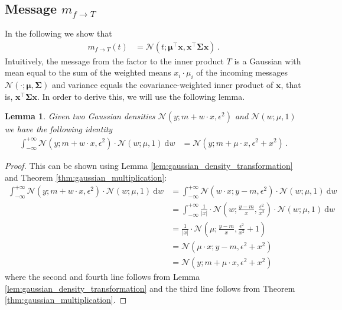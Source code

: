 \documentclass[a4paper]{article}
\newcommand{\Normal}[3]{{\mathcal N} \left({#1};{#2},{#3}\right)}
\newcommand{\bs}[1]{{\boldsymbol{#1}}}
\newcommand{\intd}[1]{\ \mathrm{d}{#1}}
\newcommand{\transpose}[1]{{#1}^\top}
\newtheorem{lemma}{Lemma}
\theoremstyle{definition}
\begin{document}
\subsection*{Message $m_{f\rightarrow T}$}
In the following we show that
\begin{align}
    m_{f\rightarrow T} (t)
     & = \Normal{t}{\transpose{\bs{\mu}}\bs{x}}{\transpose{\bs{x}}\bs{\Sigma}\bs{x}} \,. \label{eq:msg_from_f_to_t_gaussian_projection_factor}
\end{align}
Intuitively, the message from the factor to the inner product $T$ is a Gaussian with mean equal to the sum of the weighted means $x_i \cdot \mu_i$ of the incoming messages $\Normal{\cdot}{\bs{\mu}}{\bs{\Sigma}}$ and variance equals the covariance-weighted inner product of $\bs{x}$, that is, $\transpose{\bs{x}}\bs{\Sigma}\bs{x}$. In order to derive this, we will use the following lemma.
\begin{lemma} \label{lem:folding_lemma}
    Given two Gaussian densities $\Normal{y}{m + w \cdot x}{\epsilon^2}$ and $\Normal{w}{\mu}{1}$ we have the following identity
    \begin{align*}
        \int_{-\infty}^{+\infty} \Normal{y}{m + w \cdot x}{\epsilon^2} \cdot \Normal{w}{\mu}{1} \intd{w}
         & = \Normal{y}{m + \mu \cdot x}{\epsilon^2 + x^2} \,. 
    \end{align*}
\end{lemma}
\begin{proof}
    This can be shown using Lemma \ref{lem:gaussian_density_transformation} and Theorem \ref{thm:gaussian_multiplication}:
    \begin{align*}
        \int_{-\infty}^{+\infty} \Normal{y}{m + w \cdot x}{\epsilon^2} \cdot \Normal{w}{\mu}{1} \intd{w}
         & = \int_{-\infty}^{+\infty} \Normal{w \cdot x}{y - m}{\epsilon^2} \cdot \Normal{w}{\mu}{1} \intd{w} \\
         & = \int_{-\infty}^{+\infty} \frac{1}{|x|} \cdot \Normal{w}{\frac{y - m}{x}}{\frac{\epsilon^2}{x^2}} \cdot \Normal{w}{\mu}{1} \intd{w} \\
         & = \frac{1}{|x|} \cdot \Normal{\mu}{\frac{y - m}{x}}{\frac{\epsilon^2}{x^2} + 1} \\
         & = \Normal{\mu \cdot x}{y - m}{\epsilon^2 + x^2} \\
         & = \Normal{y}{ m + \mu \cdot x}{\epsilon^2 + x^2} 
    \end{align*}
    where the second and fourth line follows from Lemma \ref{lem:gaussian_density_transformation} and the third line follows from Theorem \ref{thm:gaussian_multiplication}.
\end{proof}
\end{document}

